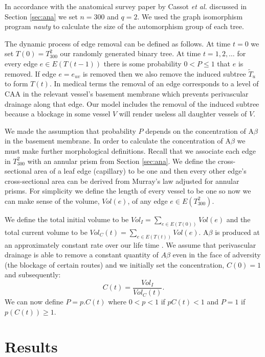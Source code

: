 \documentclass[12pt]{article} %
\theoremstyle{definition}
\begin{document}
In accordance with the anatomical survey paper by Cassot \emph{et al.} discussed in Section \ref{sec:ana} we set $n = 300$ and  $q=2$.  
We used the graph isomorphism program \emph{nauty} \cite{nauty} to calculate the size of the automorphism group of each tree.  

The dynamic process of edge removal can be defined as follows.  At time $t=0$ we set $T(0) = T^{2}_{300}$ our randomly generated binary tree.  At time  $t = 1,2,\dots$ for every edge  $e \in E(T(t-1))$ there is some probability $0<P\leq 1$ that $e $ is removed.  If edge $e = e_{uv}$ is removed then we also remove the induced subtree $\tilde{T}_{u}$ to form $T(t)$.  In medical terms the removal of an edge corresponds to a level of CAA in the relevant vessel's basement membrane which prevents perivascular drainage along that edge.  Our model includes the removal of the induced subtree because a blockage in some vessel $V$ will render useless all daughter vessels of $V$.  

We made the assumption that probability $P$ depends on the concentration of A$\beta$ in the basement membrane. 
 In order to calculate the concentration of A$\beta$ we must make further morphological definitions.   Recall that we associate each edge in $T_{300}^{2}$ with an annular prism from Section \ref{sec:ana}.  We define the cross-sectional area of a leaf edge (capillary) to be one and then every other edge's cross-sectional area can be derived from Murray's law adjusted for annular prisms.  For simplicity we define the length of every vessel to be one so now we can make sense of the volume, $Vol(e)$, of any edge $e \in E(T_{300}^{2})$.

We define the total initial volume to be $Vol_{I} =  \sum_{e \in E(T(0))} Vol(e)$ and the total current volume to be $Vol_{C}(t) = \sum_{e \in E(T(t))} Vol(e)$.   A$\beta$ is produced at an approximately constant rate over our life time \cite{wellermicro}. 
We assume  that perivascular drainage is able to remove a constant quantity of $A\beta$ even in the face of adversity (the blockage of certain routes) 
and we initially set the concentration, $C(0) = 1$ and subsequently: 
\[C(t) = \frac{Vol_{I}}{Vol_{C}(t)}.\]
We can now define $P = p.C(t)$ where $0<p<1$ if $pC(t)<1$ and $P = 1$ if $p(C(t)) \geq 1$.     

 
\section{Results}  
\end{document}
